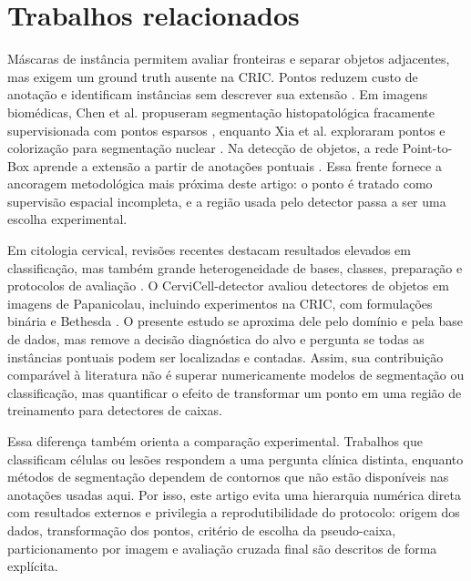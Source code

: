 \FloatBarrier
\section{Trabalhos relacionados}

M\'ascaras de inst\^ancia permitem avaliar fronteiras e separar objetos
adjacentes, mas exigem um ground truth ausente na CRIC. Pontos reduzem custo de
anota\c{c}\~ao e identificam inst\^ancias sem descrever sua extens\~ao
\cite{chen2021sparsepoints,xia2023colorization,chen2023p2bnet,ribera2019locating}. Em imagens
biom\'edicas, Chen et al. propuseram segmenta\c{c}\~ao histopatol\'ogica fracamente
supervisionada com pontos esparsos \cite{chen2021sparsepoints}, enquanto Xia et
al. exploraram pontos e coloriza\c{c}\~ao para segmenta\c{c}\~ao nuclear
\cite{xia2023colorization}. Na detec\c{c}\~ao de objetos, a rede Point-to-Box aprende a
extens\~ao a partir de anota\c{c}\~oes pontuais \cite{chen2023p2bnet,cheng2022pointly}. Essa frente
fornece a ancoragem metodol\'ogica mais pr\'oxima deste artigo: o ponto \'e tratado
como supervis\~ao espacial incompleta, e a regi\~ao usada pelo detector passa a ser
uma escolha experimental.

Em citologia cervical, revis\~oes recentes destacam resultados elevados em
classifica\c{c}\~ao, mas tamb\'em grande heterogeneidade de bases, classes,
prepara\c{c}\~ao e protocolos de avalia\c{c}\~ao \cite{jiang2023systematic}. O
CerviCell-detector avaliou detectores de objetos em imagens de Papanicolau,
incluindo experimentos na CRIC, com formula\c{c}\~oes bin\'aria e Bethesda
\cite{kalbhor2023cervicell}. O presente estudo se aproxima dele pelo dom\'inio e
pela base de dados, mas remove a decis\~ao diagn\'ostica do alvo e pergunta se
todas as inst\^ancias pontuais podem ser localizadas e contadas. Assim, sua
contribui\c{c}\~ao compar\'avel \`a literatura n\~ao \'e superar numericamente
modelos de segmenta\c{c}\~ao ou classifica\c{c}\~ao, mas quantificar o efeito de
transformar um ponto em uma regi\~ao de treinamento para detectores de caixas.

Essa diferen\c{c}a tamb\'em orienta a compara\c{c}\~ao experimental. Trabalhos que
classificam c\'elulas ou les\~oes respondem a uma pergunta cl\'inica distinta,
enquanto m\'etodos de segmenta\c{c}\~ao dependem de contornos que n\~ao est\~ao
dispon\'iveis nas anota\c{c}\~oes usadas aqui. Por isso, este artigo evita uma
hierarquia num\'erica direta com resultados externos e privilegia a
reprodutibilidade do protocolo: origem dos dados, transforma\c{c}\~ao dos pontos,
crit\'erio de escolha da pseudo-caixa, particionamento por imagem e avalia\c{c}\~ao
cruzada final s\~ao descritos de forma expl\'icita.
